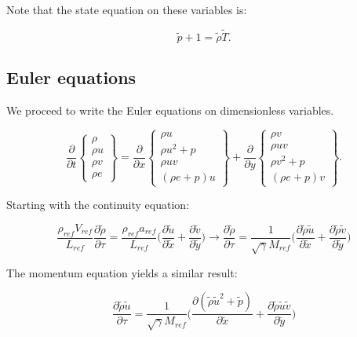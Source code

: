 \documentclass[10pt,a4paper]{article}
\begin{document}
Note that the state equation on these variables is:

\begin{equation}
\tilde{p} + 1 = \tilde{\rho}\tilde{T}.
\end{equation}

\subsection{Euler equations}

We proceed to write the Euler equations on dimensionless variables.

\begin{equation}
\frac{\partial}{\partial t}\left\{\begin{array}{c}\rho \\ \rho u \\ \rho v \\ \rho e \end{array}\right\} = \frac{\partial }{\partial x}\left\{\begin{array}{c} \rho u \\ \rho u^2 + p \\ \rho u v \\ (\rho e + p)u \end{array}\right\} +  \frac{\partial }{\partial y}\left\{\begin{array}{c} \rho v \\ \rho uv \\ \rho v^2 + p \\ (\rho e + p)v \end{array}\right\}.
\end{equation}

Starting with the continuity equation:

\begin{equation}
\frac{\rho_{ref} V_{ref}}{L_{ref}} \frac{\partial \tilde{\rho}}{\partial \tau} = \frac{\rho_{ref} a_{ref}}{L_{ref}}\biggl( \frac{\partial \tilde{u} }{\partial \tilde{x}}+\frac{\partial \tilde{v} }{\partial \tilde{y}}\biggr)	\rightarrow \frac{\partial \tilde{\rho}}{\partial \tau} = \frac{1}{\sqrt{\gamma}M_{ref}}\biggl( \frac{\partial \tilde{\rho}\tilde{u} }{\partial \tilde{x}}+\frac{\partial \tilde{\rho}\tilde{v} }{\partial \tilde{y}}\biggr)
\end{equation}

The momentum equation yields a similar result:

\begin{equation}
\frac{\partial \tilde{\rho}\tilde{u}}{\partial \tau} = \frac{1}{\sqrt{\gamma}M_{ref}}\biggl( \frac{\partial (\tilde{\rho}\tilde{u}^2 + \tilde{p}) }{\partial \tilde{x}}+\frac{\partial \tilde{\rho}\tilde{u}\tilde{v} }{\partial \tilde{y}}\biggr)
\end{equation}
\end{document}
